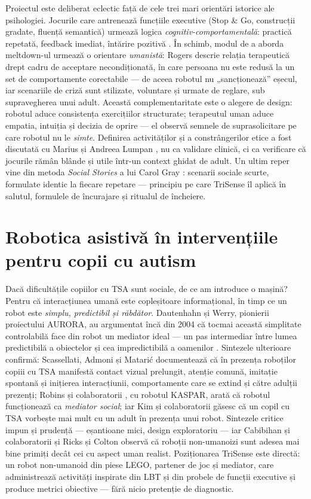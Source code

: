 Proiectul este deliberat eclectic față de cele trei mari orientări istorice ale psihologiei. Jocurile care antrenează funcțiile executive (Stop \& Go, construcții gradate, fluență semantică) urmează logica \emph{cognitiv-comportamentală}: practică repetată, feedback imediat, întărire pozitivă \cite{diamond2013}. În schimb, modul de a aborda meltdown-ul urmează o orientare \emph{umanistă}: Rogers descrie relația terapeutică drept cadru de acceptare necondiționată, în care persoana nu este redusă la un set de comportamente corectabile \cite{rogers1951} — de aceea robotul nu „sancționează” eșecul, iar scenariile de criză sunt stilizate, voluntare și urmate de reglare, sub supravegherea unui adult. Această complementaritate este o alegere de design: robotul aduce consistența exercițiilor structurate; terapeutul uman aduce empatia, intuiția și decizia de oprire — el observă semnele de suprasolicitare pe care robotul nu le \emph{simte}. Definirea activităților și a constrângerilor etice a fost discutată cu Marius și Andreea Lumpan \cite{lumpanagerpres2025}, nu ca validare clinică, ci ca verificare că jocurile rămân blânde și utile într-un context ghidat de adult. Un ultim reper vine din metoda \emph{Social Stories} a lui Carol Gray \cite{gray2010}: scenarii sociale scurte, formulate identic la fiecare repetare — principiu pe care TriSense îl aplică în salutul, formulele de încurajare și ritualul de încheiere.

\section{Robotica asistivă în intervențiile pentru copii cu autism}

Dacă dificultățile copiilor cu TSA sunt sociale, de ce am introduce o mașină? Pentru că interacțiunea umană este copleșitoare informațional, în timp ce un robot este \emph{simplu, predictibil și răbdător}. Dautenhahn și Werry, pionierii proiectului AURORA, au argumentat încă din 2004 că tocmai această simplitate controlabilă face din robot un mediator ideal — un pas intermediar între lumea predictibilă a obiectelor și cea impredictibilă a oamenilor \cite{dautenhahn2004}. Sintezele ulterioare confirmă: Scassellati, Admoni și Matarić \cite{scassellati2012} documentează că în prezența roboților copiii cu TSA manifestă contact vizual prelungit, atenție comună, imitație spontană și inițierea interacțiunii, comportamente care se extind și către adulții prezenți; Robins și colaboratorii \cite{robins2005}, cu robotul KASPAR, arată că robotul funcționează ca \emph{mediator social}; iar Kim și colaboratorii \cite{kim2013} găsesc că un copil cu TSA vorbește mai mult cu un adult în prezența unui robot. Sintezele critice impun și prudență — eșantioane mici, design exploratoriu \cite{diehl2012, pennisi2016} — iar Cabibihan și colaboratorii \cite{cabibihan2013} și Ricks și Colton \cite{ricks2010} observă că roboții non-umanoizi sunt adesea mai bine primiți decât cei cu aspect uman realist. Poziționarea TriSense este directă: un robot non-umanoid din piese LEGO, partener de joc și mediator, care administrează activități inspirate din LBT și din probele de funcții executive și produce metrici obiective — fără nicio pretenție de diagnostic.

